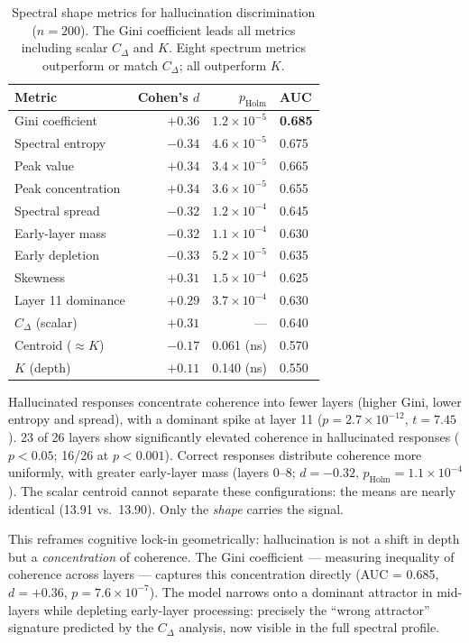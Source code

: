 \documentclass{article}
\begin{document}
\begin{table}[h]
\centering
\small
\begin{tabular}{lrrl}
\toprule
Metric & Cohen's $d$ & $p_\text{Holm}$ & AUC \\
\midrule
Gini coefficient        & $+0.36$ & $1.2 \times 10^{-5}$ & \textbf{0.685} \\
Spectral entropy        & $-0.34$ & $4.6 \times 10^{-5}$ & 0.675 \\
Peak value              & $+0.34$ & $3.4 \times 10^{-5}$ & 0.665 \\
Peak concentration      & $+0.34$ & $3.6 \times 10^{-5}$ & 0.655 \\
Spectral spread         & $-0.32$ & $1.2 \times 10^{-4}$ & 0.645 \\
Early-layer mass        & $-0.32$ & $1.1 \times 10^{-4}$ & 0.630 \\
Early depletion         & $-0.33$ & $5.2 \times 10^{-5}$ & 0.635 \\
Skewness                & $+0.31$ & $1.5 \times 10^{-4}$ & 0.625 \\
Layer 11 dominance      & $+0.29$ & $3.7 \times 10^{-4}$ & 0.630 \\
\midrule
$C_\Delta$ (scalar)     & $+0.31$ & --- & 0.640 \\
Centroid ($\approx K$)  & $-0.17$ & 0.061 (ns) & 0.570 \\
$K$ (depth)             & $+0.11$ & 0.140 (ns) & 0.550 \\
\bottomrule
\end{tabular}
\caption{Spectral shape metrics for hallucination discrimination
($n = 200$). The Gini coefficient leads all metrics including
scalar $C_\Delta$ and $K$. Eight spectrum metrics outperform or
match $C_\Delta$; all outperform $K$.}
\label{tab:spectrum}
\end{table}

Hallucinated responses concentrate coherence into fewer layers
(higher Gini, lower entropy and spread), with a dominant spike at
layer 11 ($p = 2.7 \times 10^{-12}$, $t = 7.45$). 23 of 26 layers
show significantly elevated coherence in hallucinated responses
($p < 0.05$; 16/26 at $p < 0.001$).
Correct responses distribute coherence more uniformly, with
greater early-layer mass (layers 0--8; $d = -0.32$,
$p_\text{Holm} = 1.1 \times 10^{-4}$). The scalar centroid
cannot separate these configurations: the means are nearly
identical (13.91 vs.\ 13.90). Only the \textit{shape} carries
the signal.

This reframes cognitive lock-in geometrically: hallucination is
not a shift in depth but a \textit{concentration} of coherence.
The Gini coefficient --- measuring inequality of coherence across
layers --- captures this concentration directly (AUC = 0.685,
$d = +0.36$, $p = 7.6 \times 10^{-7}$). The model narrows onto
a dominant attractor in mid-layers while depleting early-layer
processing: precisely the ``wrong attractor'' signature predicted
by the $C_\Delta$ analysis, now visible in the full spectral
profile.
\end{document}
